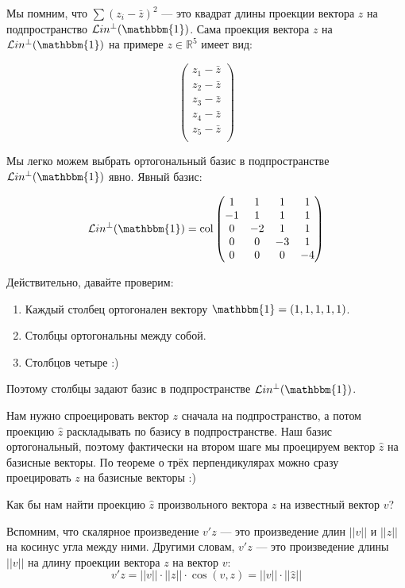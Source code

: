\documentclass[11pt,russian,]{article}
\newcommand{\RR}{\mathbb{R}}
\newcommand{\1}{\mathbbm{1}}
\newcommand{\Lin}{\mathcal{L}in}
\newcommand{\Linp}{\Lin^{\perp}}
\newcommand{\col}{\mathcal{col}}
\renewcommand{\col}{\mathrm{col}}
\begin{document}
Мы помним, что \(\sum (z_i - \bar z)^2\) --- это квадрат длины проекции
вектора \(z\) на подпространство \(\Linp (\1)\). Сама проекция вектора
\(z\) на \(\Linp (\1)\) на примере \(z \in \RR^{5}\) имеет вид:

\[
\begin{pmatrix}
z_1 - \bar z \\
z_2 - \bar z \\
z_3 - \bar z \\
z_4 - \bar z \\
z_5 - \bar z \\
\end{pmatrix}
\]

Мы легко можем выбрать ортогональный базис в подпространстве
\(\Linp (\1)\) явно. Явный базис:

\[
\Linp (\1) = \col \begin{pmatrix}
1  & 1  & 1  & 1  \\
-1 & 1  & 1  & 1  \\
0  & -2 & 1  & 1  \\
0  & 0  & -3 & 1  \\
0  & 0  & 0  & -4  \\
\end{pmatrix}
\]

Действительно, давайте проверим:

\begin{enumerate}
\def\labelenumi{\arabic{enumi}.}
\item
  Каждый столбец ортогонален вектору \(\1 = (1, 1, 1, 1, 1)\).
\item
  Столбцы ортогональны между собой.
\item
  Столбцов четыре :)
\end{enumerate}

Поэтому столбцы задают базис в подпространстве \(\Linp (\1)\).

Нам нужно спроецировать вектор \(z\) сначала на подпространство, а потом
проекцию \(\hat z\) раскладывать по базису в подпространстве. Наш базис
ортогональный, поэтому фактически на втором шаге мы проецируем вектор
\(\hat z\) на базисные векторы. По теореме о трёх перпендикулярах можно
сразу проецировать \(z\) на базисные векторы :)

Как бы нам найти проекцию \(\hat z\) произвольного вектора \(z\) на
известный вектор \(v\)?

Вспомним, что скалярное произведение \(v'z\) --- это произведение длин
\(||v||\) и \(||z||\) на косинус угла между ними. Другими словам,
\(v'z\) --- это произведение длины \(||v||\) на длину проекции вектора
\(z\) на вектор \(v\): \[
v'z = ||v||\cdot ||z||\cdot \cos(v, z) = ||v||\cdot ||\hat z||
\]
\end{document}

